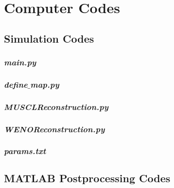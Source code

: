 \chapter{Computer Codes}
\label{ap:code}
\graphicspath{{image_directory/appendix/}}
\lstset{inputpath=code/}


\section{Simulation Codes}
	
\subsection{\emph{main.py}}
\label{code:main} 
	\lstset{style=p}
	
	
\newpage

\subsection{\emph{define$\_$map.py}}
\label{code:definemap} 
	\lstset{style=p}
	
	
\newpage

\subsection{\emph{MUSCLReconstruction.py}}
\label{code:musclreconstruction} 
	\lstset{style=p}
	
	
\newpage

\subsection{\emph{WENOReconstruction.py}}
\label{code:wenoreconstruction} 
	\lstset{style=p}
	

\subsection{\emph{params.txt}}
\label{code:params} 
	\lstset{style=txt}
	
	
\newpage

\section{MATLAB Postprocessing Codes}
\lstset{inputpath=code/MATLAB/}
\label{code:MATLABpostprocessing}

